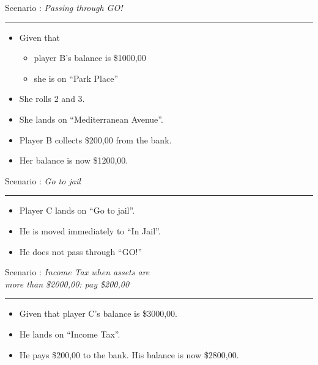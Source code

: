 \documentclass[handout,t,12pt]{beamer}
\newcommand{\Square}[1]{``#1''}
\newcommand{\money}[1]{\$#1,00}
\newcounter{scenarioid}\setcounter{scenarioid}{0}
\newenvironment{scenario}[1]{%
\addtocounter{scenarioid}{1} 
{\Large Scenario \thescenarioid: \emph{#1}\\[3px]\hrule}
\vspace{1\bigskipamount}
}{%
}
\begin{document}
  \begin{frame}
    \begin{scenario}{Passing through GO!}
      \begin{itemize}
        \item Given that 
        \begin{itemize}
          \item player B's balance is \money{1000}
          \item she is on \Square{Park Place}          
        \end{itemize}
        \item She rolls 2 and 3.
        \item She lands on \Square{Mediterranean Avenue}.
        \item Player B collects \money{200} from the bank.
        \item Her balance is now \money{1200}.
      \end{itemize}
      
    \end{scenario}
  \end{frame}

  \begin{frame}
    \begin{scenario}{Go to jail}
      \begin{itemize}
        \item Player C lands on \Square{Go to jail}.
        \item He is moved immediately to \Square{In Jail}.
        \item He does not pass through \Square{GO!}
      \end{itemize}
    \end{scenario}
  \end{frame}
  

  \begin{frame}
    \begin{scenario}{Income Tax when assets are\\more than \money{2000}: pay \money{200}}
      \begin{itemize}
        \item Given that player C's balance is \money{3000}.
        \item He lands on \Square{Income Tax}.
        \item He pays \money{200} to the bank.  His balance is now \money{2800}.
      \end{itemize}
    \end{scenario}
  \end{frame}
\end{document}
